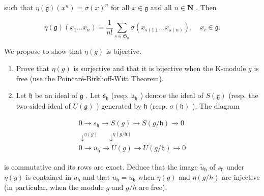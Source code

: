 such that \(\eta (\mathfrak{g})(x^n) = \sigma (x)^n\) for all \(x\in \mathfrak{g}\) and all \(n\in \mathbf{N}\) . Then

\[
\eta (\mathfrak {g}) (x _ {1} \dots x _ {n}) = \frac {1}{n !} \sum_ {s \in \mathfrak {S} _ {n}} \sigma (x _ {s (1)} \dots x _ {s (n)}), \quad x _ {i} \in \mathfrak {g}.
\]

We propose to show that \(\eta(g)\) is bijective.

\begin{enumerate}
\def\labelenumi{(\alph{enumi})}
\item
  Prove that \(\eta(g)\) is surjective and that it is bijective when the K-module \(g\) is free (use the Poincaré-Birkhoff-Witt Theorem).
\item
  Let \(\mathfrak{h}\) be an ideal of \(\mathfrak{g}\) . Let \(\mathfrak{s}_{\mathfrak{h}}\) (resp. \(\mathfrak{u}_{\mathfrak{h}}\) ) denote the ideal of \(S(\mathfrak{g})\) (resp. the two-sided ideal of \(U(\mathfrak{g})\) ) generated by \(\mathfrak{h}\) (resp. \(\sigma(\mathfrak{h})\) ). The diagram
\end{enumerate}

\[
\begin{array}{c} 0 \to s _ {\mathfrak {h}} \to S (g) \to S (g / \mathfrak {h}) \to 0 \\ \downarrow^ {\eta (g)} \quad \downarrow^ {\eta (g / \mathfrak {h})} \\ 0 \to u _ {\mathfrak {h}} \to U (g) \to U (g / \mathfrak {h}) \to 0 \end{array}
\]

is commutative and its rows are exact. Deduce that the image \(\tilde{u}_{\mathfrak{h}}\) of \(s_{\mathfrak{h}}\) under \(\eta(g)\) is contained in \(u_{\mathfrak{h}}\) and that \(\tilde{u}_{\mathfrak{h}} = u_{\mathfrak{h}}\) when \(\eta(g)\) and \(\eta(g/h)\) are injective (in particular, when the module \(g\) and \(g/h\) are free).

